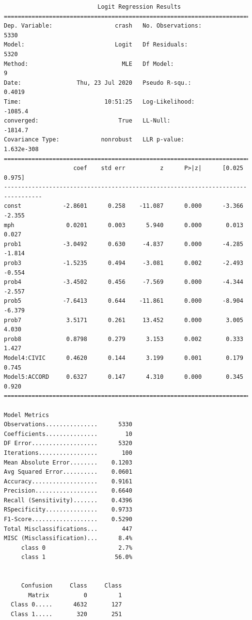 \documentclass[12pt]{article}
\begin{document}
\begin{verbatim}
                           Logit Regression Results                           
==============================================================================
Dep. Variable:                  crash   No. Observations:                 5330
Model:                          Logit   Df Residuals:                     5320
Method:                           MLE   Df Model:                            9
Date:                Thu, 23 Jul 2020   Pseudo R-squ.:                  0.4019
Time:                        10:51:25   Log-Likelihood:                -1085.4
converged:                       True   LL-Null:                       -1814.7
Covariance Type:            nonrobust   LLR p-value:                1.632e-308
=================================================================================
                    coef    std err          z      P>|z|      [0.025      0.975]
---------------------------------------------------------------------------------
const            -2.8601      0.258    -11.087      0.000      -3.366      -2.355
mph               0.0201      0.003      5.940      0.000       0.013       0.027
prob1            -3.0492      0.630     -4.837      0.000      -4.285      -1.814
prob3            -1.5235      0.494     -3.081      0.002      -2.493      -0.554
prob4            -3.4502      0.456     -7.569      0.000      -4.344      -2.557
prob5            -7.6413      0.644    -11.861      0.000      -8.904      -6.379
prob7             3.5171      0.261     13.452      0.000       3.005       4.030
prob8             0.8798      0.279      3.153      0.002       0.333       1.427
Model4:CIVIC      0.4620      0.144      3.199      0.001       0.179       0.745
Model5:ACCORD     0.6327      0.147      4.310      0.000       0.345       0.920
=================================================================================

Model Metrics
Observations...............      5330
Coefficients...............        10
DF Error...................      5320
Iterations.................       100
Mean Absolute Error........    0.1203
Avg Squared Error..........    0.0601
Accuracy...................    0.9161
Precision..................    0.6640
Recall (Sensitivity).......    0.4396
RSpecificity...............    0.9733
F1-Score...................    0.5290
Total Misclassifications...       447
MISC (Misclassification)...      8.4%
     class 0                     2.7%
     class 1                    56.0%


     Confusion     Class     Class
       Matrix          0         1
  Class 0.....      4632       127
  Class 1.....       320       251


\end{verbatim}
\end{document}
